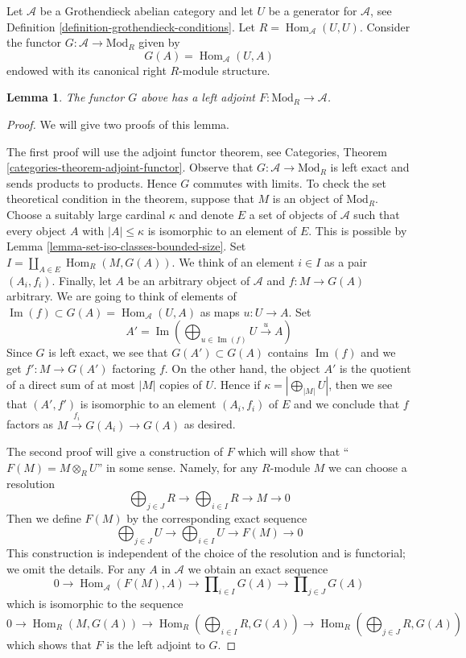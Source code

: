 \documentclass{amsart}
\theoremstyle{plain}
\newtheorem{lemma}[subsection]{Lemma}
\theoremstyle{definition}
\theoremstyle{remark}
\numberwithin{equation}{subsection}
\def\Hom{\mathop{\mathrm{Hom}}\nolimits}
\def\Im{\mathop{\mathrm{Im}}}
\begin{document}
\medskip\noindent
Let $\mathcal{A}$ be a Grothendieck abelian category and let $U$ be a
generator for $\mathcal{A}$, see
Definition \ref{definition-grothendieck-conditions}.
Let $R = \Hom_\mathcal{A}(U, U)$. Consider the functor
$G : \mathcal{A} \to \text{Mod}_R$ given by
$$
G(A) = \Hom_\mathcal{A}(U, A)
$$
endowed with its canonical right $R$-module structure.

\begin{lemma}
\label{lemma-gabriel-popescu-left-adjoint}
The functor $G$ above has a left adjoint
$F : \text{Mod}_R \to \mathcal{A}$.
\end{lemma}

\begin{proof}
We will give two proofs of this lemma.

\medskip\noindent
The first proof will use the adjoint functor theorem, see
Categories, Theorem \ref{categories-theorem-adjoint-functor}.
Observe that $G : \mathcal{A} \to \text{Mod}_R$ is left exact and sends
products to products. Hence $G$ commutes with limits. To check the set
theoretical condition in the theorem, suppose that $M$ is an object of
$\text{Mod}_R$. Choose a suitably large cardinal $\kappa$ and denote $E$
a set of objects of $\mathcal{A}$ such that every object $A$ with
$|A| \leq \kappa$ is isomorphic to an element of $E$. This is possible
by Lemma \ref{lemma-set-iso-classes-bounded-size}. Set
$I = \coprod_{A \in E} \Hom_R(M, G(A))$.
We think of an element $i \in I$ as a pair $(A_i, f_i)$.
Finally, let $A$ be an arbitrary object of $\mathcal{A}$
and $f : M \to G(A)$ arbitrary. We are going to think of
elements of $\Im(f) \subset G(A) = \Hom_\mathcal{A}(U, A)$
as maps $u : U \to A$. Set
$$
A' = \Im(\bigoplus\nolimits_{u \in \Im(f)} U \xrightarrow{u} A)
$$
Since $G$ is left exact, we see that $G(A') \subset G(A)$
contains $\Im(f)$ and we get $f' : M \to G(A')$ factoring $f$.
On the other hand, the object $A'$ is
the quotient of a direct sum of at most $|M|$ copies of $U$.
Hence if $\kappa = |\bigoplus_{|M|} U|$, then we see that $(A', f')$
is isomorphic to an element $(A_i, f_i)$ of $E$ and we conclude that $f$
factors as $M \xrightarrow{f_i} G(A_i) \to G(A)$ as desired.

\medskip\noindent
The second proof will give a construction of $F$ which will show
that ``$F(M) = M \otimes_R U$'' in some sense. Namely, for any
$R$-module $M$ we can choose a resolution
$$
\bigoplus\nolimits_{j \in J} R \to
\bigoplus\nolimits_{i \in I} R \to
M \to 0
$$
Then we define $F(M)$ by the corresponding exact sequence
$$
\bigoplus\nolimits_{j \in J} U \to
\bigoplus\nolimits_{i \in I} U \to
F(M) \to 0
$$
This construction is independent of the choice of the resolution
and is functorial; we omit the details.
For any $A$ in $\mathcal{A}$ we obtain an exact sequence
$$
0 \to \Hom_\mathcal{A}(F(M), A) \to
\prod\nolimits_{i \in I} G(A) \to
\prod\nolimits_{j \in J} G(A)
$$
which is isomorphic to the sequence
$$
0 \to \Hom_R(M, G(A)) \to
\Hom_R(\bigoplus\nolimits_{i \in I} R, G(A)) \to
\Hom_R(\bigoplus\nolimits_{j \in J} R, G(A))
$$
which shows that $F$ is the left adjoint to $G$.
\end{proof}
\end{document}
